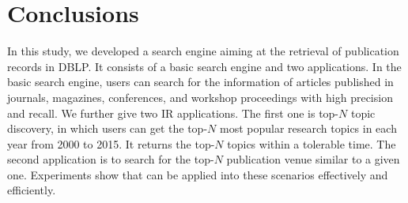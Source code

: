 \section{Conclusions}\label{sec:conclusion}


In this study, we developed a search engine {\SS} aiming at the retrieval of publication records in DBLP.
It consists of a basic search engine and two applications.
In the basic search engine, users can search for the information of articles published in journals, magazines, conferences, and workshop proceedings with high precision and recall. 
We further give two IR applications. The first one is top-$N$ topic discovery, in which users can get the top-$N$ most popular research topics in each year from 2000 to 2015. It returns the top-$N$ topics within a tolerable time. The second application is to search for the top-$N$ publication venue similar to a given one. Experiments show that {\SS} can be applied into these scenarios effectively and efficiently.